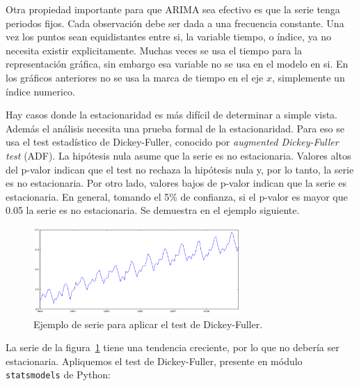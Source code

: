 \documentclass[11pt,spanish,listoffigures,listoftables]{tfgetsinf}
\begin{document}
    Otra propiedad importante para que ARIMA sea efectivo es que la serie tenga periodos fijos. Cada observación debe ser dada a una frecuencia constante. Una vez los puntos sean equidistantes entre si, la variable tiempo, o índice, ya no necesita existir explicitamente. Muchas veces se usa el tiempo para la representación gráfica, sin embargo esa variable no se usa en el modelo en si. En los gráficos anteriores no se usa la marca de tiempo en el eje \(x\), simplemente un índice numerico. 
    
    Hay casos donde la estacionaridad es más difícil de determinar a simple vista. Además el análisis necesita una prueba formal de la estacionaridad. Para eso se usa el test estadístico de Dickey-Fuller, conocido por {\em augmented Dickey-Fuller test} (ADF). La hipótesis nula asume que la serie es no estacionaria. Valores altos del p-valor indican que el test no rechaza la hipótesis nula y, por lo tanto, la serie es no estacionaria. Por otro lado, valores bajos de p-valor indican que la serie es estacionaria. En general, tomando el 5\% de confianza, si el p-valor es mayor que 0.05 la serie es no estacionaria. Se demuestra en el ejemplo siguiente.
    
    
    \begin{figure}[h]
        \centering
        \includegraphics[width=0.7\textwidth]{timeseries_log.png}
        \caption{Ejemplo de serie para aplicar el test de Dickey-Fuller.}
        \label{fig:time_serie_1}
    \end{figure}
    
    La serie de la figura~\ref{fig:time_serie_1} tiene una tendencia creciente, por lo que no debería ser estacionaria. Apliquemos el test de Dickey-Fuller, presente en módulo {\tt statsmodels} de Python:
    
\end{document}
